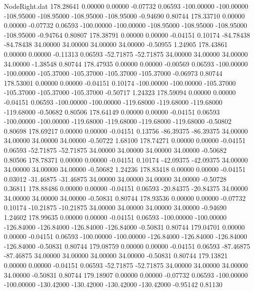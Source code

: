\begin{filecontents}{NodeRight.dat}
 178.28641    0.00000    0.00000    -0.07732    0.06593 -100.00000 -100.00000 -108.95000 -108.95000 -108.95000 -108.95000   -0.94690    0.80744
 178.33710    0.00000    0.00000    -0.07732    0.06593 -100.00000 -100.00000 -108.95000 -108.95000 -108.95000 -108.95000   -0.94764    0.80807
 178.38791    0.00000    0.00000    -0.04151    0.10174  -84.78438  -84.78438   34.00000   34.00000   34.00000   34.00000   -0.50955    1.24905
 178.43861    0.00000    0.00000    -0.11313    0.06593  -52.71875  -52.71875   34.00000   34.00000   34.00000   34.00000   -1.38548    0.80744
 178.47935    0.00000    0.00000    -0.00569    0.06593 -100.00000 -100.00000 -105.37000 -105.37000 -105.37000 -105.37000   -0.06973    0.80744
 178.53001    0.00000    0.00000    -0.04151    0.10174 -100.00000 -100.00000 -105.37000 -105.37000 -105.37000 -105.37000   -0.50717    1.24323
 178.59094    0.00000    0.00000    -0.04151    0.06593 -100.00000 -100.00000 -119.68000 -119.68000 -119.68000 -119.68000   -0.50682    0.80506
 178.64149    0.00000    0.00000    -0.04151    0.06593 -100.00000 -100.00000 -119.68000 -119.68000 -119.68000 -119.68000   -0.50802    0.80698
 178.69217    0.00000    0.00000    -0.04151    0.13756  -86.39375  -86.39375   34.00000   34.00000   34.00000   34.00000   -0.50722    1.68100
 178.74271    0.00000    0.00000    -0.04151    0.06593  -52.71875  -52.71875   34.00000   34.00000   34.00000   34.00000   -0.50682    0.80506
 178.78371    0.00000    0.00000    -0.04151    0.10174  -42.09375  -42.09375   34.00000   34.00000   34.00000   34.00000   -0.50682    1.24236
 178.83418    0.00000    0.00000    -0.04151    0.03012  -31.46875  -31.46875   34.00000   34.00000   34.00000   34.00000   -0.50728    0.36811
 178.88486    0.00000    0.00000    -0.04151    0.06593  -20.84375  -20.84375   34.00000   34.00000   34.00000   34.00000   -0.50831    0.80744
 178.93536    0.00000    0.00000    -0.07732    0.10174  -10.21875  -10.21875   34.00000   34.00000   34.00000   34.00000   -0.94690    1.24602
 178.99635    0.00000    0.00000    -0.04151    0.06593 -100.00000 -100.00000 -126.84000 -126.84000 -126.84000 -126.84000   -0.50831    0.80744
 179.04701    0.00000    0.00000    -0.04151    0.06593 -100.00000 -100.00000 -126.84000 -126.84000 -126.84000 -126.84000   -0.50831    0.80744
 179.08759    0.00000    0.00000    -0.04151    0.06593  -87.46875  -87.46875   34.00000   34.00000   34.00000   34.00000   -0.50831    0.80744
 179.13821    0.00000    0.00000    -0.04151    0.06593  -52.71875  -52.71875   34.00000   34.00000   34.00000   34.00000   -0.50831    0.80744
 179.18907    0.00000    0.00000    -0.07732    0.06593 -100.00000 -100.00000 -130.42000 -130.42000 -130.42000 -130.42000   -0.95142    0.81130

\end{filecontents}
